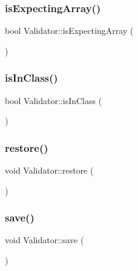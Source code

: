\mbox{\label{classValidator_a4452dfbd72b35d4cd4053e7efbc24f24}} 
\subsubsection{\texorpdfstring{is\+Expecting\+Array()}{isExpectingArray()}}
{\footnotesize\ttfamily bool Validator\+::is\+Expecting\+Array (\begin{DoxyParamCaption}{ }\end{DoxyParamCaption})}

\mbox{\label{classValidator_a497b47a6718ba3b84a73bc9ee4fd9796}} 
\subsubsection{\texorpdfstring{is\+In\+Class()}{isInClass()}}
{\footnotesize\ttfamily bool Validator\+::is\+In\+Class (\begin{DoxyParamCaption}{ }\end{DoxyParamCaption})}

\mbox{\label{classValidator_a0c89c0c840be87b9011cb518d7bc12ff}} 
\subsubsection{\texorpdfstring{restore()}{restore()}}
{\footnotesize\ttfamily void Validator\+::restore (\begin{DoxyParamCaption}{ }\end{DoxyParamCaption})}

\mbox{\label{classValidator_a055e6bdb84438449655135b9166bcf2d}} 
\subsubsection{\texorpdfstring{save()}{save()}}
{\footnotesize\ttfamily void Validator\+::save (\begin{DoxyParamCaption}{ }\end{DoxyParamCaption})}

